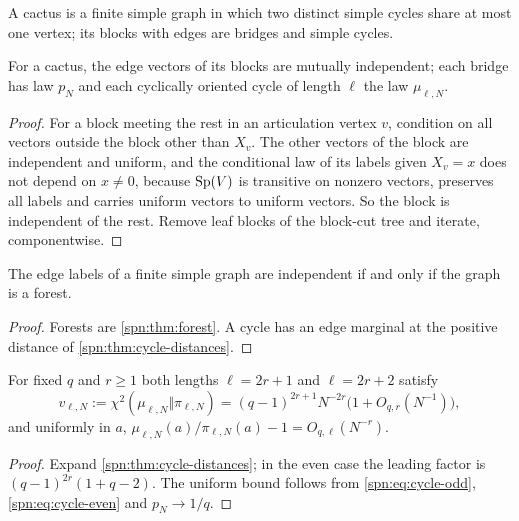 A cactus is a finite simple graph in which two distinct simple cycles share at most one vertex; its
blocks with edges are bridges and simple cycles.

\begin{theorem}\label{spn:thm:cactus}
For a cactus, the edge vectors of its blocks are mutually independent; each bridge has law $p_N$
and each cyclically oriented cycle of length $\ell$ the law $\mu_{\ell,N}$.
\end{theorem}

\begin{proof}
For a block meeting the rest in an articulation vertex $v$, condition on all vectors outside the
block other than $X_v$. The other vectors of the block are independent and uniform, and the
conditional law of its labels given $X_v=x$ does not depend on $x\ne0$, because $\operatorname{Sp}(V)$ is transitive
on nonzero vectors, preserves all labels and carries uniform vectors to uniform vectors. So the block
is independent of the rest. Remove leaf blocks of the block-cut tree and iterate, componentwise.
\end{proof}

\begin{corollary}\label{spn:cor:forest-only}
The edge labels of a finite simple graph are independent if and only if the graph is a forest.
\end{corollary}

\begin{proof}
Forests are \cref{spn:thm:forest}. A cycle has an edge marginal at the positive distance of
\cref{spn:thm:cycle-distances}.
\end{proof}

\begin{corollary}\label{spn:cor:paired}
For fixed $q$ and $r\ge1$ both lengths $\ell=2r+1$ and $\ell=2r+2$ satisfy
\[
 v_{\ell,N}:=\chi^2(\mu_{\ell,N}\Vert\pi_{\ell,N})=(q-1)^{2r+1}N^{-2r}\bigl(1+O_{q,r}(N^{-1})\bigr),
\]
and uniformly in $a$, $\mu_{\ell,N}(a)/\pi_{\ell,N}(a)-1=O_{q,\ell}(N^{-r})$.
\end{corollary}

\begin{proof}
Expand \cref{spn:thm:cycle-distances}; in the even case the leading factor is
$(q-1)^{2r}(1+q-2)$. The uniform bound follows from \eqref{spn:eq:cycle-odd},
\eqref{spn:eq:cycle-even} and $p_N\to1/q$.
\end{proof}

